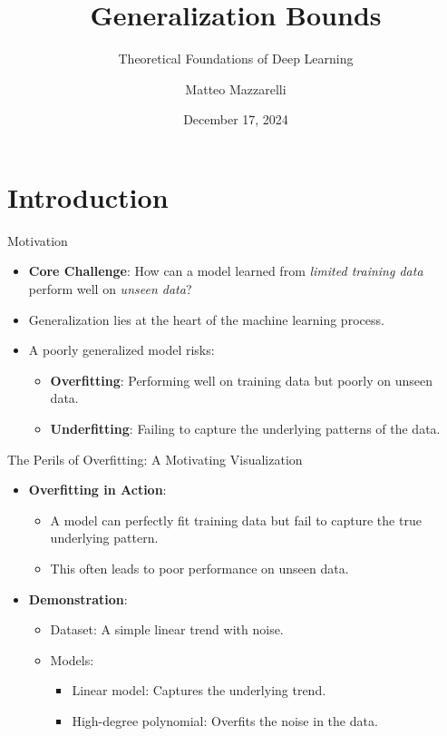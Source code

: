 \documentclass[
  ignorenonframetext,
]{beamer}
\title{Generalization Bounds}
\subtitle{Theoretical Foundations of Deep Learning}
\author{Matteo Mazzarelli}
\date{December 17, 2024}
\providecommand{\tightlist}{%
  \setlength{\itemsep}{0pt}\setlength{\parskip}{0pt}}\usepackage{longtable,booktabs,array}
\begin{document}
\frame{\titlepage}


\section{Introduction}\label{introduction}

\begin{frame}{Motivation}
\label{motivation}
\begin{itemize}
\tightlist
\item
  \textbf{Core Challenge}: How can a model learned from \emph{limited
  training data} perform well on \emph{unseen data}?
\item
  Generalization lies at the heart of the machine learning process.
\item
  A poorly generalized model risks:

  \begin{itemize}
  \tightlist
  \item
    \textbf{Overfitting}: Performing well on training data but poorly on
    unseen data.
  \item
    \textbf{Underfitting}: Failing to capture the underlying patterns of
    the data.
  \end{itemize}
\end{itemize}
\end{frame}

\begin{frame}{The Perils of Overfitting: A Motivating Visualization}
\label{the-perils-of-overfitting-a-motivating-visualization}
\begin{itemize}
\tightlist
\item
  \textbf{Overfitting in Action}:

  \begin{itemize}
  \tightlist
  \item
    A model can perfectly fit training data but fail to capture the true
    underlying pattern.
  \item
    This often leads to poor performance on unseen data.
  \end{itemize}
\item
  \textbf{Demonstration}:

  \begin{itemize}
  \tightlist
  \item
    Dataset: A simple linear trend with noise.
  \item
    Models:

    \begin{itemize}
    \tightlist
    \item
      Linear model: Captures the underlying trend.
    \item
      High-degree polynomial: Overfits the noise in the data.
    \end{itemize}
  \end{itemize}
\end{itemize}
\end{frame}
\end{document}

